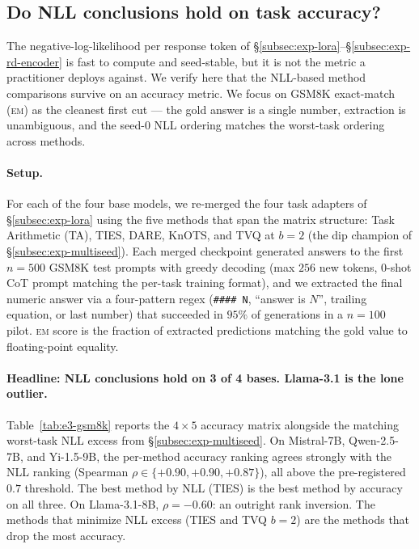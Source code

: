 
\subsection{Do NLL conclusions hold on task accuracy?}
\label{subsec:exp-downstream-gsm8k}

The negative-log-likelihood per response token of
\S\ref{subsec:exp-lora}--\S\ref{subsec:exp-rd-encoder} is fast to
compute and seed-stable, but it is not the metric a practitioner
deploys against. We verify here that the NLL-based method
comparisons survive on an accuracy metric. We focus on GSM8K
exact-match (\textsc{em}) as the cleanest first cut --- the gold
answer is a single number, extraction is unambiguous, and the
seed-0 NLL ordering matches the worst-task ordering across methods.

\paragraph{Setup.} For each of the four base models, we re-merged
the four task adapters of \S\ref{subsec:exp-lora} using the five
methods that span the matrix structure: Task Arithmetic (TA), TIES,
DARE, KnOTS, and TVQ at $b=2$ (the dip champion of
\S\ref{subsec:exp-multiseed}). Each merged checkpoint generated
answers to the first $n=500$ GSM8K test prompts with greedy decoding
(max $256$ new tokens, $0$-shot CoT prompt matching the per-task
training format), and we extracted the final numeric answer via
a four-pattern regex (\verb|#### N|, ``answer is $N$'', trailing
equation, or last number) that succeeded in $95\%$ of generations
in a $n=100$ pilot. \textsc{em} score is the fraction of extracted
predictions matching the gold value to floating-point equality.

\paragraph{Headline: NLL conclusions hold on 3 of 4 bases. Llama-3.1
is the lone outlier.}
Table~\ref{tab:e3-gsm8k} reports the $4 \times 5$ accuracy matrix
alongside the matching worst-task NLL excess from
\S\ref{subsec:exp-multiseed}. On Mistral-7B, Qwen-2.5-7B, and
Yi-1.5-9B, the per-method accuracy ranking agrees strongly with
the NLL ranking (Spearman $\rho \in \{+0.90, +0.90, +0.87\}$),
all above the pre-registered $0.7$ threshold. The best method by
NLL (TIES) is the best method by accuracy on all three. On
Llama-3.1-8B, $\rho = -0.60$: an outright rank inversion. The
methods that minimize NLL excess (TIES and TVQ $b=2$) are the
methods that drop the most accuracy.

